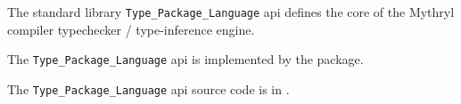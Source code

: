 
The standard library {\tt Type\_Package\_Language} api defines the core of the Mythryl compiler typechecker / type-inference engine.

The {\tt Type\_Package\_Language} api is implemented by the  package.

The {\tt Type\_Package\_Language} api source code is in .






